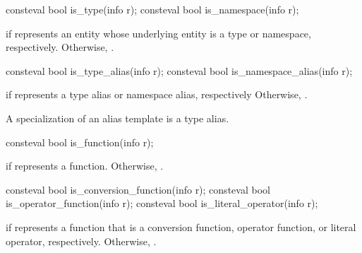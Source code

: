 %
%
\begin{itemdecl}
consteval bool is_type(info r);
consteval bool is_namespace(info r);
\end{itemdecl}

\begin{itemdescr}
\pnum
\returns
{} if  represents an entity
whose underlying entity is a type or namespace, respectively.
Otherwise, .
\end{itemdescr}

%
%
\begin{itemdecl}
consteval bool is_type_alias(info r);
consteval bool is_namespace_alias(info r);
\end{itemdecl}

\begin{itemdescr}
\pnum
\returns
{} if  represents a type alias or namespace alias, respectively
Otherwise, .
\begin{note}
A specialization of an alias template is a type alias.
\end{note}
\end{itemdescr}

%
\begin{itemdecl}
consteval bool is_function(info r);
\end{itemdecl}

\begin{itemdescr}
\pnum
\returns
{} if  represents a function.
Otherwise, .
\end{itemdescr}

%
%
%
\begin{itemdecl}
consteval bool is_conversion_function(info r);
consteval bool is_operator_function(info r);
consteval bool is_literal_operator(info r);
\end{itemdecl}

\begin{itemdescr}
\pnum
\returns
{} if  represents a function that is a
conversion function,
operator function, or
literal operator, respectively.
Otherwise, .
\end{itemdescr}

